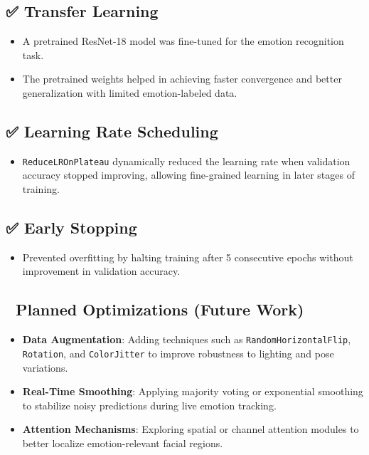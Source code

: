 \documentclass[
  letterpaper,
  DIV=11,
  numbers=noendperiod]{scrreport}
\providecommand{\tightlist}{%
  \setlength{\itemsep}{0pt}\setlength{\parskip}{0pt}}
\begin{document}
\subsection{✅ Transfer Learning}\label{transfer-learning}

\begin{itemize}
\tightlist
\item
  A pretrained ResNet-18 model was fine-tuned for the emotion
  recognition task.
\item
  The pretrained weights helped in achieving faster convergence and
  better generalization with limited emotion-labeled data.
\end{itemize}

\subsection{✅ Learning Rate Scheduling}\label{learning-rate-scheduling}

\begin{itemize}
\tightlist
\item
  \texttt{ReduceLROnPlateau} dynamically reduced the learning rate when
  validation accuracy stopped improving, allowing fine-grained learning
  in later stages of training.
\end{itemize}

\subsection{✅ Early Stopping}\label{early-stopping}

\begin{itemize}
\tightlist
\item
  Prevented overfitting by halting training after 5 consecutive epochs
  without improvement in validation accuracy.
\end{itemize}

\subsection{🚀 Planned Optimizations (Future
Work)}\label{planned-optimizations-future-work}

\begin{itemize}
\tightlist
\item
  \textbf{Data Augmentation}: Adding techniques such as
  \texttt{RandomHorizontalFlip}, \texttt{Rotation}, and
  \texttt{ColorJitter} to improve robustness to lighting and pose
  variations.
\item
  \textbf{Real-Time Smoothing}: Applying majority voting or exponential
  smoothing to stabilize noisy predictions during live emotion tracking.
\item
  \textbf{Attention Mechanisms}: Exploring spatial or channel attention
  modules to better localize emotion-relevant facial regions.
\end{itemize}
\end{document}
